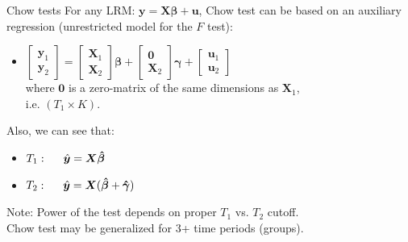 \documentclass{beamer}
\begin{document}
\begin{frame}{Chow tests}
For any LRM: $\bm{y} = \bm{X\beta}+\bm{u}$, Chow test can be based on an auxiliary regression (unrestricted model for the $F$ test):\\
\vspace{0.3cm}
\begin{itemize}
\item 
$ \begin{bmatrix} \bm{y}_1 \\ \bm{y}_2 \end{bmatrix} = 
\begin{bmatrix} \bm{X}_1 \\ \bm{X}_2 \end{bmatrix} \bm{\beta} +
\begin{bmatrix} \bm{0} \\ \bm{X}_2 \end{bmatrix} \bm{\gamma} +
\begin{bmatrix} \bm{u}_1 \\ \bm{u}_2 \end{bmatrix}$ \\
\vspace{0.3cm}
where $\bm{0}$ is a zero-matrix of the same dimensions as $\bm{X}_1$, 
\\ i.e. $(T_1 \! \times \! K)$.
\end{itemize} \medskip
Also, we can see that:
\begin{itemize}
\item 
$ T_1: \hspace{0.5cm} \hat{\bm{y}}= \bm{X} \bm{\hat{\beta}}  $ 
\item 
$ T_2: \hspace{0.5cm} \hat{\bm{y}}= \bm{X} 
  ( \bm{\hat{\beta}} + \bm{\hat{\gamma}} ) $ 
\end{itemize} \medskip
Note: Power of the test depends on proper $T_1$ vs. $T_2$ cutoff. 
\\ Chow test may be generalized for 3+ time periods (groups).
\end{frame}
\end{document}
